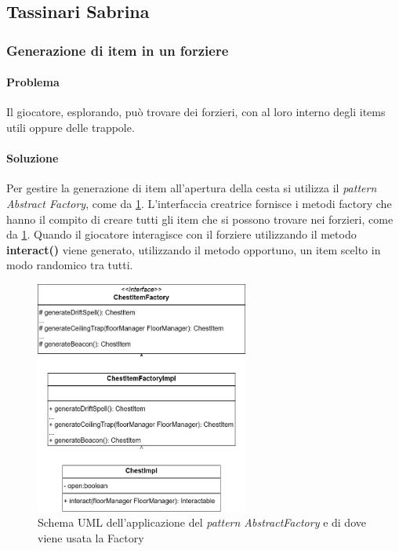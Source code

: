 \documentclass{report}
\begin{document}
\subsection{Tassinari Sabrina}

\subsubsection{Generazione di item in un forziere}

\paragraph{Problema} Il giocatore, esplorando, può trovare dei forzieri, con al loro interno degli items utili oppure delle trappole. 

\paragraph{Soluzione} Per gestire la generazione di item all'apertura della cesta si utilizza il \textit{pattern Abstract Factory}, come da \ref{img:chestItemFactory}.
%
L'interfaccia creatrice fornisce i metodi factory che hanno il compito di creare tutti gli item che si possono trovare nei forzieri, come da \ref{img:chestItemFactory}. 
%
Quando il giocatore interagisce con il forziere utilizzando il metodo \textbf{interact()} viene generato, utilizzando il metodo opportuno, un item scelto in modo randomico tra tutti.

\begin{figure}[H]
    \centering
    \includegraphics[width=7cm]{patternFactory.drawio.png}
    \caption{Schema UML dell'applicazione del \textit{pattern AbstractFactory} e di dove viene usata la Factory}
    \label{img:chestItemFactory}
\end{figure}
\end{document}
